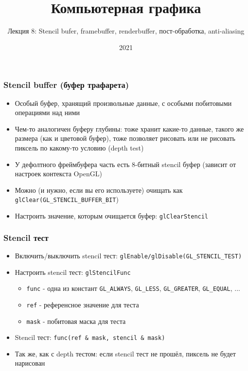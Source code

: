 \documentclass{beamer}
\title{Компьютерная графика}
\subtitle{Лекция 8: Stencil bufer, framebuffer, renderbuffer, пост-обработка, anti-aliasing}
\date{2021}
\begin{document}
\frame{\titlepage}

\begin{frame}[fragile]
\frametitle{Stencil buffer (буфер трафарета)}
\begin{itemize}
\item Особый буфер, хранящий произвольные данные, с особыми побитовыми операциями над ними
\pause
\item Чем-то аналогичен буферу глубины: тоже хранит какие-то данные, такого же размера (как и цветовой буфер), тоже позволяет рисовать или не рисовать пиксель по какому-то условию (depth test)
\pause
\item У дефолтного фреймбуфера часть есть 8-битный stencil буфер (зависит от настроек контекста OpenGL)
\pause
\item Можно (и нужно, если вы его используете) очищать как \verb|glClear(GL_STENCIL_BUFFER_BIT|)
\pause
\item Настроить значение, которым очищается буфер: \verb|glClearStencil|
\end{itemize}
\end{frame}

\begin{frame}[fragile]
\frametitle{Stencil тест}
\begin{itemize}
\item Включить/выключить stencil тест: \verb|glEnable/glDisable(GL_STENCIL_TEST)|
\pause
\item Настроить stencil тест: \verb|glStencilFunc|
\begin{itemize}
\item \verb|func| - одна из констант \verb|GL_ALWAYS|, \verb|GL_LESS|, \verb|GL_GREATER|, \verb|GL_EQUAL|, ...
\item \verb|ref| - референсное значение для теста
\item \verb|mask| - побитовая маска для теста
\end{itemize}
\item Stencil тест: \verb|func(ref & mask, stencil & mask)|
\pause
\item Так же, как с depth тестом: если stencil тест не прошёл, пиксель не будет нарисован
\end{itemize}
\end{frame}
\end{document}
